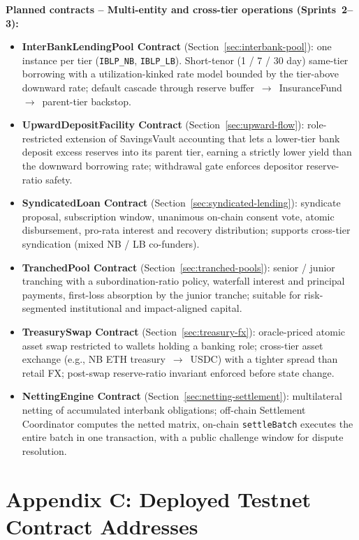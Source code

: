 \documentclass[12pt,a4paper]{report}
\begin{document}
\textbf{Planned contracts -- Multi-entity and cross-tier operations (Sprints~2--3):}
\begin{itemize}[noitemsep]
\item \textbf{InterBankLendingPool Contract} (Section~\ref{sec:interbank-pool}): one instance per tier (\texttt{IBLP\_NB}, \texttt{IBLP\_LB}). Short-tenor (1 / 7 / 30 day) same-tier borrowing with a utilization-kinked rate model bounded by the tier-above downward rate; default cascade through reserve buffer~$\to$~InsuranceFund~$\to$~parent-tier backstop.
\item \textbf{UpwardDepositFacility Contract} (Section~\ref{sec:upward-flow}): role-restricted extension of SavingsVault accounting that lets a lower-tier bank deposit excess reserves into its parent tier, earning a strictly lower yield than the downward borrowing rate; withdrawal gate enforces depositor reserve-ratio safety.
\item \textbf{SyndicatedLoan Contract} (Section~\ref{sec:syndicated-lending}): syndicate proposal, subscription window, unanimous on-chain consent vote, atomic disbursement, pro-rata interest and recovery distribution; supports cross-tier syndication (mixed NB / LB co-funders).
\item \textbf{TranchedPool Contract} (Section~\ref{sec:tranched-pools}): senior / junior tranching with a subordination-ratio policy, waterfall interest and principal payments, first-loss absorption by the junior tranche; suitable for risk-segmented institutional and impact-aligned capital.
\item \textbf{TreasurySwap Contract} (Section~\ref{sec:treasury-fx}): oracle-priced atomic asset swap restricted to wallets holding a banking role; cross-tier asset exchange (e.g., NB ETH treasury~$\to$~USDC) with a tighter spread than retail FX; post-swap reserve-ratio invariant enforced before state change.
\item \textbf{NettingEngine Contract} (Section~\ref{sec:netting-settlement}): multilateral netting of accumulated interbank obligations; off-chain Settlement Coordinator computes the netted matrix, on-chain \texttt{settleBatch} executes the entire batch in one transaction, with a public challenge window for dispute resolution.
\end{itemize}


\chapter*{Appendix C: Deployed Testnet Contract Addresses}
{}
\end{document}
